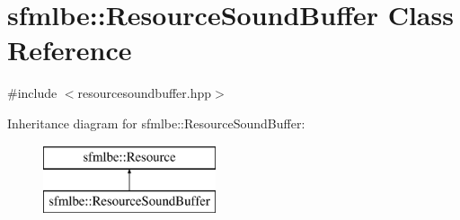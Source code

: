 \hypertarget{classsfmlbe_1_1_resource_sound_buffer}{}\section{sfmlbe\+:\+:Resource\+Sound\+Buffer Class Reference}
\label{classsfmlbe_1_1_resource_sound_buffer}


{\ttfamily \#include $<$resourcesoundbuffer.\+hpp$>$}

Inheritance diagram for sfmlbe\+:\+:Resource\+Sound\+Buffer\+:\begin{figure}[H]
\begin{center}
\leavevmode
\includegraphics[height=2.000000cm]{classsfmlbe_1_1_resource_sound_buffer}
\end{center}
\end{figure}

